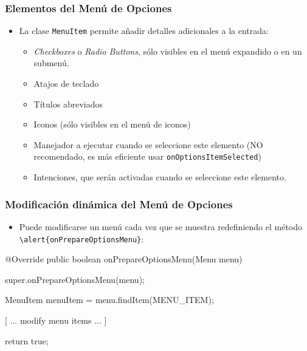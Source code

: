 \documentclass[hyperref={pdfpagelabels=true},ucs]{beamer}
\begin{document}
\begin{frame}[fragile]
\frametitle{Elementos del Menú de Opciones}

\begin{itemize}
\item La clase \verb|MenuItem| permite añadir detalles adicionales a
  la entrada:
  \begin{itemize}
  \item \emph{Checkboxes} o \emph{Radio Buttons}, sólo visibles en el menú expandido o en un submenú.
  \item Atajos de teclado
  \item Títulos abreviados
  \item Iconos (sólo visibles en el menú de iconos)
  \item Manejador a ejecutar cuando se seleccione este elemento (NO
    recomendado, es más eficiente usar \verb|onOptionsItemSelected|)
  \item Intenciones, que serán activadas cuando se seleccione este
    elemento.
  \end{itemize}
\end{itemize}


\end{frame}


\begin{frame}[fragile]
\frametitle{Modificación dinámica del Menú de Opciones}

\begin{itemize}
\item Puede modificarse un menú cada vez que se muestra redefiniendo
  el método \Verb|\alert{onPrepareOptionsMenu}|:
\end{itemize}

\begin{scriptsize}
\begin{block}{}
\begin{java}
@Override
public boolean onPrepareOptionsMenu(Menu menu) {
  super.onPrepareOptionsMenu(menu);

  MenuItem menuItem = menu.findItem(MENU_ITEM);

  [ ... modify menu items ... ]

  return true;
}
\end{java}
\end{block}
\end{scriptsize}


\end{frame}
\end{document}
